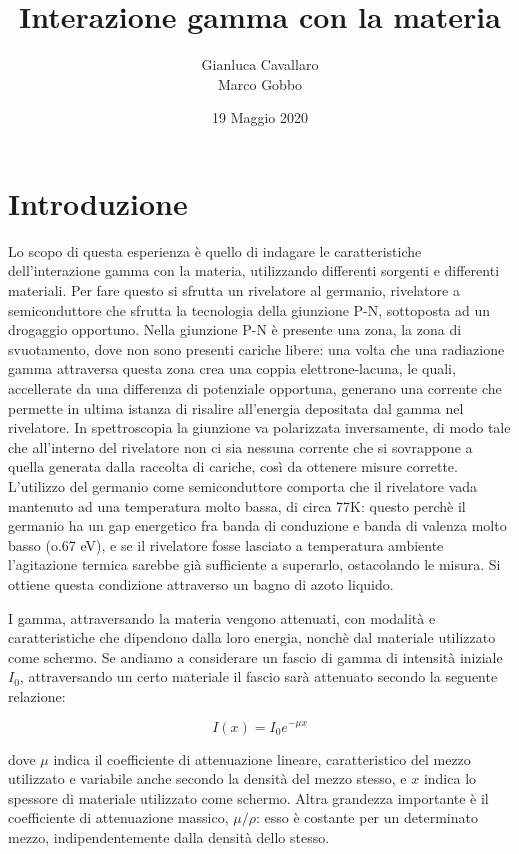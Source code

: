 \documentclass[a4paper,10pt]{article}
\title{Interazione gamma con la materia}
\author{Gianluca Cavallaro \\ Marco Gobbo}
\date{19 Maggio 2020}
\begin{document}
\maketitle


\section{Introduzione}
Lo scopo di questa esperienza è quello di indagare le caratteristiche dell'interazione gamma con la materia, utilizzando differenti sorgenti e differenti materiali. Per fare questo si sfrutta un rivelatore al germanio, rivelatore a semiconduttore che sfrutta la tecnologia della giunzione P-N, sottoposta ad un drogaggio opportuno. Nella giunzione P-N è presente una zona, la zona di svuotamento, dove non sono presenti cariche libere: una volta che una radiazione gamma attraversa questa zona crea una coppia elettrone-lacuna, le quali, accellerate da una differenza di potenziale opportuna, generano una corrente che permette in ultima istanza di risalire all'energia depositata dal gamma nel rivelatore. In spettroscopia la giunzione va polarizzata inversamente, di modo tale che all'interno del rivelatore non ci sia nessuna corrente che si sovrappone a quella generata dalla raccolta di cariche, così da ottenere misure corrette. L'utilizzo del germanio come semiconduttore comporta che il rivelatore vada mantenuto ad una temperatura molto bassa, di circa 77K: questo perchè il germanio ha un gap energetico fra banda di conduzione e banda di valenza molto basso (o.67 eV), e se il rivelatore fosse lasciato a temperatura ambiente l'agitazione termica sarebbe già sufficiente a superarlo, ostacolando le misura. Si ottiene questa condizione attraverso un bagno di azoto liquido.

I gamma, attraversando la materia vengono attenuati, con modalità e caratteristiche che dipendono dalla loro energia, nonchè dal materiale utilizzato come schermo. Se andiamo a considerare un fascio di gamma di intensità iniziale $I_0$, attraversando un certo materiale il fascio sarà attenuato secondo la seguente relazione:

\begin{equation}
	I(x)=I_{0}e^{-\mu x}
\end{equation}

dove $\mu$ indica il coefficiente di attenuazione lineare, caratteristico del mezzo utilizzato e variabile anche secondo la densità del mezzo stesso, e $x$ indica lo spessore di materiale utilizzato come schermo. Altra grandezza importante è il coefficiente di attenuazione massico, $\mu/\rho$: esso è costante per un determinato mezzo, indipendentemente dalla densità dello stesso. 
\end{document}
